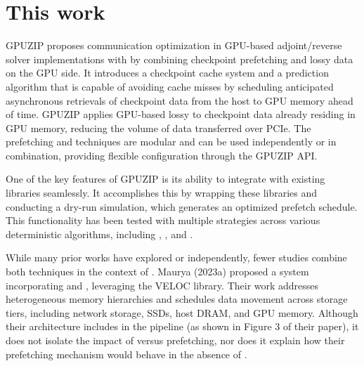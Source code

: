 \documentclass[Ingles]{ic-tese-v3}
\begin{document}
\section{This work}
\label{sec:thiswork}


GPUZIP proposes communication optimization in GPU-based adjoint/reverse solver implementations with \checkpointing by combining checkpoint prefetching and lossy data \compression on the GPU side. It introduces a checkpoint cache system and a prediction algorithm that is capable of avoiding cache misses by scheduling anticipated asynchronous retrievals of checkpoint data from the host to GPU memory ahead of time. GPUZIP applies GPU-based lossy \compression to checkpoint data already residing in GPU memory, reducing the volume of data transferred over PCIe. The prefetching and \compression techniques are modular and can be used independently or in combination, providing flexible configuration through the GPUZIP API.

One of the key features of GPUZIP is its ability to integrate with existing \checkpointing libraries seamlessly. It accomplishes this by wrapping these libraries and conducting a dry-run simulation, which generates an optimized prefetch schedule. This functionality has been tested with multiple \checkpointing strategies across various deterministic algorithms, including \revolve, \zcut, and \uniform.

While many prior works have explored \prefetching or \compression independently, fewer studies combine both techniques in the context of \checkpointing. Maurya \etal (2023a)\cite{maurya2023} proposed a system incorporating \prefetching and \compression, leveraging the VELOC library. Their work addresses heterogeneous memory hierarchies and schedules data movement across storage tiers, including network storage, SSDs, host DRAM, and GPU memory. Although their architecture includes \compression in the pipeline (as shown in Figure 3 of their paper), it does not isolate the impact of \compression versus prefetching, nor does it explain how their prefetching mechanism would behave in the absence of \compression.
\end{document}
